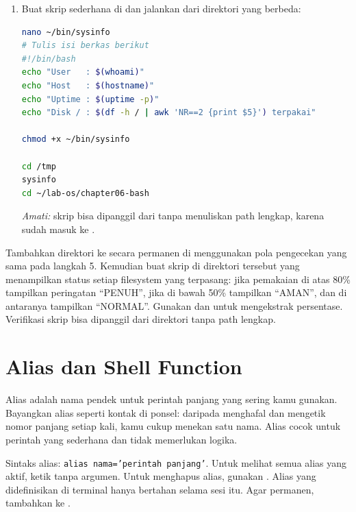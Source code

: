 \begin{enumerate}
\begin{lstlisting}[language=bash, caption={Menambahkan ~/bin ke PATH}]
source ~/.bashrc
echo "$PATH" | tr ':' '\n' | head -5
\end{lstlisting}

    \item Buat skrip sederhana di  dan jalankan dari direktori
          yang berbeda:
\begin{lstlisting}[language=bash, caption={Membuat dan menguji skrip di ~/bin}]
nano ~/bin/sysinfo
# Tulis isi berkas berikut
#!/bin/bash
echo "User   : $(whoami)"
echo "Host   : $(hostname)"
echo "Uptime : $(uptime -p)"
echo "Disk / : $(df -h / | awk 'NR==2 {print $5}') terpakai"

chmod +x ~/bin/sysinfo

cd /tmp
sysinfo
cd ~/lab-os/chapter06-bash
\end{lstlisting}
    \textit{Amati:} skrip  bisa dipanggil dari 
    tanpa menuliskan path lengkap, karena  sudah masuk ke
    .
\end{enumerate}

\begin{challengebox}
Tambahkan direktori  ke  secara
permanen di  menggunakan pola pengecekan yang sama pada
langkah 5. Kemudian buat skrip  di direktori tersebut yang
menampilkan status setiap filesystem yang terpasang: jika pemakaian di atas
80\% tampilkan peringatan ``PENUH'', jika di bawah 50\% tampilkan ``AMAN'',
dan di antaranya tampilkan ``NORMAL''. Gunakan  dan 
untuk mengekstrak persentase. Verifikasi skrip bisa dipanggil dari
direktori  tanpa path lengkap.
\end{challengebox}

\section{Alias dan Shell Function}
\label{sec:alias-fungsi-shell}

Alias adalah nama pendek untuk perintah panjang yang sering kamu gunakan.
Bayangkan alias seperti kontak di ponsel: daripada menghafal dan mengetik
nomor panjang setiap kali, kamu cukup menekan satu nama. Alias cocok untuk
perintah yang sederhana dan tidak memerlukan logika.

Sintaks alias: \texttt{alias nama='perintah panjang'}. Untuk melihat semua
alias yang aktif, ketik  tanpa argumen. Untuk menghapus alias,
gunakan . Alias yang didefinisikan di terminal hanya
bertahan selama sesi itu. Agar permanen, tambahkan ke .

